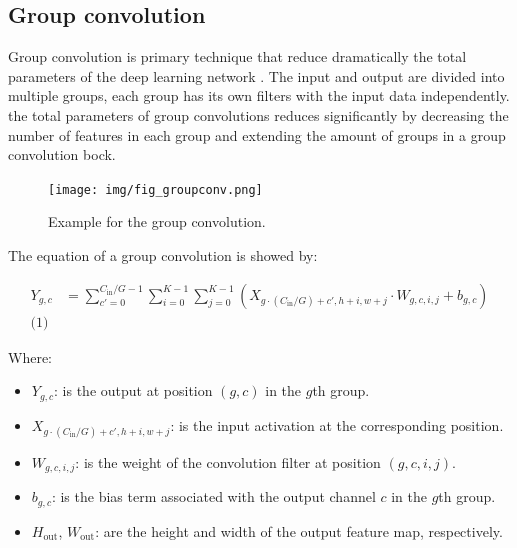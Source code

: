 \documentclass[journal]{IEEEtran} %
\begin{document}
\subsection{Group convolution}
Group convolution is primary technique that reduce dramatically the total parameters of the deep learning network \cite{b9}. The input and output are divided into multiple groups, each group has its own filters with the input data independently. the total parameters of group convolutions reduces significantly by decreasing the number of features in each group and extending the amount of groups in a group convolution bock.

\begin{figure}[H]
    \centering
    \texttt{[image: img/fig\_groupconv.png]}
    \caption{Example for the group convolution.}
    \label{fig}
\end{figure}

\indent
The equation of a group convolution is showed by:

\[
\begin{aligned}
Y_{g, c} &= \sum_{c' = 0}^{C_{\text{in}} / G - 1} \sum_{i=0}^{K-1} \sum_{j=0}^{K-1} (X_{g \cdot (C_{\text{in}} / G) + c', h+i, w+j} \cdot W_{g, c, i, j} + b_{g, c})
\label{eq:convolution_equation}
\\
\text{(1)}
\end{aligned}
\]

\indent
 Where:
\begin{itemize}
    \item $Y_{g,c}$: is the output at position $(g,c)$ in the $g$th group.
    \item $X_{g \cdot (C_{\text{in}} / G) + c', h+i, w+j}$: is the input activation at the corresponding position.
    \item $W_{g, c, i, j}$: is the weight of the convolution filter at position $(g, c, i, j)$.
    \item $b_{g, c}$: is the bias term associated with the output channel $c$ in the $g$th group.
    \item $H_{\text{out}}$, $W_{\text{out}}$: are the height and width of the output feature map, respectively.
\end{itemize}
\end{document}
